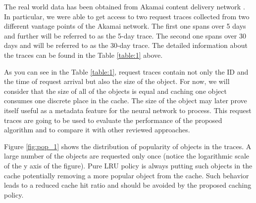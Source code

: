 The real world data has been obtained from Akamai content delivery network \cite{12}. In particular, we were able to get access to two request traces collected from two different vantage points of the Akamai network. The first one spans over 5 days and further will be referred to as the 5-day trace. The second one spans over 30 days and will be referred to as the 30-day trace. The detailed information about the traces can be found in the Table \ref{table:1} above.

As you can see in the Table \ref{table:1}, request traces contain not only the ID and the time of request arrival but also the size of the object. For now, we will consider that the size of all of the objects is equal and caching one object consumes one discrete place in the cache. The size of the object may later prove itself useful as a metadata feature for the neural network to process. This request traces are going to be used to evaluate the performance of the proposed algorithm and to compare it with other reviewed approaches.



Figure \ref{fig:pop_1} shows the distribution of popularity of objects in the traces. A large number of the objects are requested only once (notice the logarithmic scale of the y axis of the figure). Pure LRU policy is always putting such objects in the cache potentially removing a more popular object from the cache. Such behavior leads to a reduced cache hit ratio and should be avoided by the proposed caching policy.

